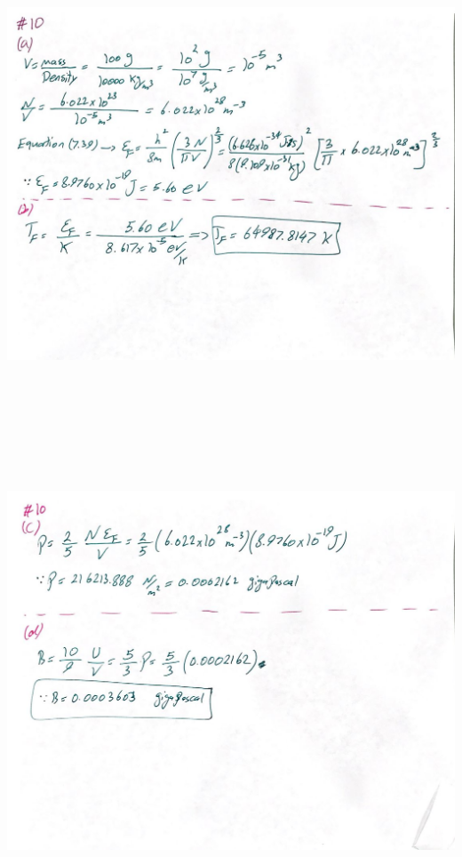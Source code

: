 \documentclass[fleqn]{article}
\begin{document}
\begin{enumerate}
    \begin{center}
      \includegraphics[height=14cm, width=15cm]{10A.JPG}
    \end{center}

    \pagebreak
    
    \begin{center}
      \includegraphics[height=14cm, width=15cm]{10B.JPG}
    \end{center}

  \end{enumerate}
\end{document}
